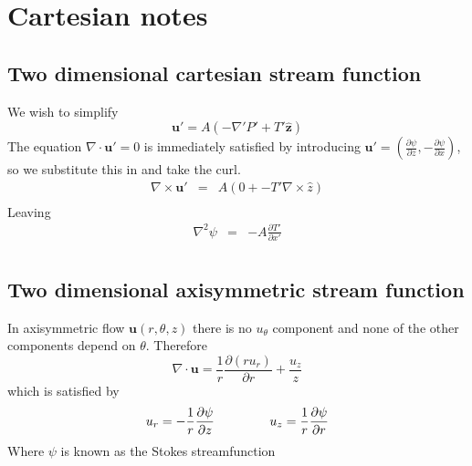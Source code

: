 \documentclass{article}
\begin{document}
\section{Cartesian notes}


\subsection{Two dimensional cartesian stream function}
We wish to simplify
\begin{equation}
\mathbf{u}' = A \left( -\nabla'P' + T'\mathbf{\hat{z}} \right)
\end{equation}
The equation $\nabla \cdot \mathbf{u}' = 0$ is immediately satisfied by introducing $\mathbf{u}' = ( \frac{\partial \psi}{\partial z}, -\frac{\partial \psi}{\partial x})$, so we substitute this in and take the curl.
\begin{eqnarray*}
\nabla \times \mathbf{u}' &=& A \left( 0 + - T' \nabla \times \hat{z} \right)\\
\end{eqnarray*}
Leaving
\begin{eqnarray*}
\nabla^2 \psi &=& - A \frac{\partial T'}{\partial x'} \\
\end{eqnarray*}

\subsection{Two dimensional axisymmetric stream function}
\label{sec:axi-streamfunction}
In axisymmetric flow $\mathbf{u}(r, \theta, z)$ there is no $u_\theta$ component and none of the other components depend on $\theta$. Therefore 
\begin{equation}
\nabla \cdot \mathbf{u} = \frac{1}{r} \frac{ \partial (r u_r) }{\partial r} + \frac{u_z}{z}
\end{equation}
which is satisfied by 
\begin{equation}
u_r = - \frac{1}{r} \frac{\partial \psi}{\partial z} \hspace{10ex} u_z = \frac{1}{r} \frac{\partial \psi}{\partial r} \label{eq:axi-streamfunction}
\end{equation}
Where $\psi$ is known as the Stokes streamfunction

\newpage
\end{document}
